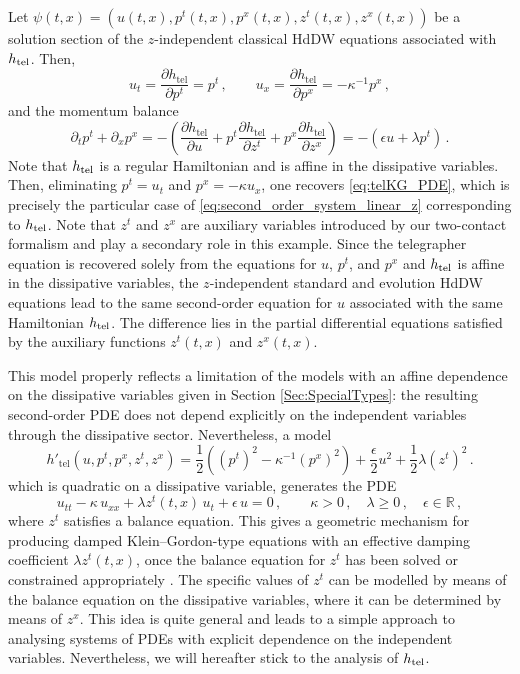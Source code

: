 \documentclass[11pt,twoside]{article}
\theoremstyle{plain}
\theoremstyle{definition}
\theoremstyle{remark}
\begin{document}
Let \(\psi(t,x)=(u(t,x),p^t(t,x),p^x(t,x),z^t(t,x),z^x(t,x))\) be a solution section of the $z$-independent classical HdDW equations associated with $h_{\rm tel}$. Then, 
\begin{equation}\label{eq:FirstEqu}
u_t=\frac{\partial h_{\mathrm{tel}}}{\partial p^t}=p^t\,,
\qquad
u_x=\frac{\partial h_{\mathrm{tel}}}{\partial p^x}=-\kappa^{-1}p^x\,,
\end{equation}
and the momentum balance
\[
\partial_t p^t+\partial_x p^x
=
-\left(\frac{\partial h_{\mathrm{tel}}}{\partial u}
+p^t\frac{\partial h_{\mathrm{tel}}}{\partial z^t}
+p^x\frac{\partial h_{\mathrm{tel}}}{\partial z^x}\right)
=-(\epsilon u+\lambda p^t)\,.
\]
Note that $h_{\rm tel}$ is a regular Hamiltonian and is affine in the dissipative variables. Then,
eliminating \(p^t=u_t\) and \(p^x=-\kappa u_x\), one recovers \eqref{eq:telKG_PDE}, which  is precisely the particular case of \eqref{eq:second_order_system_linear_z} corresponding to $h_{\rm tel}$. Note that \(z^t\) and \(z^x\) are auxiliary variables introduced by our two-contact formalism and play a secondary role in this example. Since the telegrapher equation is recovered solely from the equations for \(u\), \(p^t\), and \(p^x\) and $h_{\rm tel}$ is affine in the dissipative variables, the $z$-independent standard and evolution HdDW equations lead to the same second-order equation for \(u\) associated with the same Hamiltonian \(h_{\rm tel}\). The difference lies in the partial differential equations satisfied by the auxiliary functions \(z^t(t,x)\) and \(z^x(t,x)\).

This model properly reflects a limitation of the models with an affine dependence on the dissipative variables given in Section \ref{Sec:SpecialTypes}: the resulting second-order PDE does not depend explicitly on the independent variables through the dissipative sector. Nevertheless, a model
\begin{equation}\label{eq:telKG_ham2}
    h'_{\mathrm{tel}}(u,p^t,p^x,z^t,z^x)
    =
    \frac12\left((p^t)^2-\kappa^{-1}(p^x)^2\right)
    +\frac{\epsilon}{2}u^2+\frac{1}{2}\lambda (z^t)^2\,.
\end{equation}
which is quadratic on a dissipative variable, generates the PDE
\begin{equation}\label{eq:telKG}
    u_{tt}-\kappa\,u_{xx}+\lambda z^t(t,x)\,u_t+\epsilon\,u=0\,,
    \qquad \kappa>0\,,\quad \lambda\geq 0\,,\quad \epsilon\in\mathbb R\,,
\end{equation}
where $z^t$ satisfies a balance equation. This gives a geometric mechanism for producing damped Klein--Gordon-type equations with an effective damping coefficient \(\lambda z^t(t,x)\), once the balance equation for \(z^t\) has been solved or constrained appropriately \cite{Malhi_Stanislavova_2018}. The specific values of $z^t$ can be modelled by means of the balance equation on the dissipative variables, where it can be determined by means of $z^x$. This idea is quite general and leads to a simple approach to analysing systems of PDEs with explicit dependence on the independent variables. Nevertheless, we will hereafter stick to the analysis of $h_{\rm tel}$. 
\end{document}
